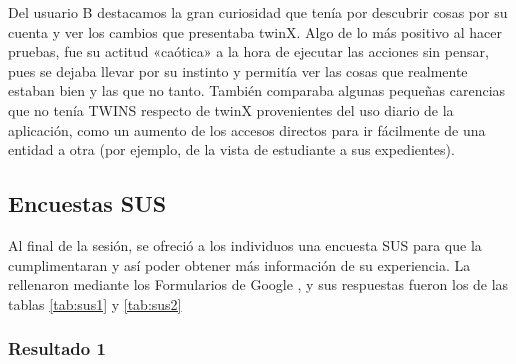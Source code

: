 Del usuario B destacamos la gran curiosidad que tenía por descubrir cosas por su cuenta y ver los cambios que presentaba twinX. Algo de lo más positivo al hacer pruebas, fue su actitud «caótica» a la hora de ejecutar las acciones sin pensar, pues se dejaba llevar por su instinto y permitía ver las cosas que realmente estaban bien y las que no tanto. También comparaba algunas pequeñas carencias que no tenía TWINS respecto de twinX provenientes del uso diario de la aplicación, como un aumento de los accesos directos para ir fácilmente de una entidad a otra (por ejemplo, de la vista de estudiante a sus expedientes).

\subsection{Encuestas SUS}

Al final de la sesión, se ofreció a los individuos una encuesta SUS para que la cumplimentaran y así poder obtener más información de su experiencia. La rellenaron mediante los Formularios de Google \cite{googleforms}, y sus respuestas fueron los de las tablas \ref{tab:sus1} y \ref{tab:sus2}

\subsubsection*{Resultado 1}

